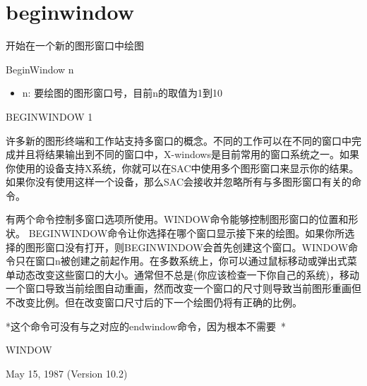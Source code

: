 \section{beginwindow}
\label{cmd:beginwindow}

开始在一个新的图形窗口中绘图

BeginWindow n

\begin{itemize}
\item n: 要绘图的图形窗口号，目前n的取值为1到10
\end{itemize}

BEGINWINDOW 1

许多新的图形终端和工作站支持多窗口的概念。不同的工作可以在不同的窗口中完成并且将结果输出到不同的窗口中，X-windows是目前常用的窗口系统之一。如果你使用的设备支持X系统，你就可以在SAC中使用多个图形窗口来显示你的结果。如果你没有使用这样一个设备，那么SAC会接收并忽略所有与多图形窗口有关的命令。

有两个命令控制多窗口选项所使用。WINDOW命令能够控制图形窗口的位置和形状。	BEGINWINDOW命令让你选择在哪个窗口显示接下来的绘图。如果你所选择的图形窗口没有打开，则BEGINWINDOW会首先创建这个窗口。WINDOW命令只在窗口n被创建之前起作用。在多数系统上，你可以通过鼠标移动或弹出式菜单动态改变这些窗口的大小。通常但不总是(你应该检查一下你自己的系统)，移动一个窗口导致当前绘图自动重画，然而改变一个窗口的尺寸则导致当前图形重画但不改变比例。但在改变窗口尺寸后的下一个绘图仍将有正确的比例。

*这个命令可没有与之对应的endwindow命令，因为根本不需要~*

WINDOW

May 15, 1987 (Version 10.2)
